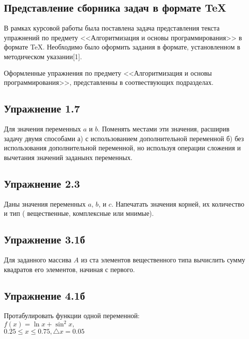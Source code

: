 \newpage
\begin{center}
\section{\fontsize{16pt}{16.8pt}Представление сборника задач в формате TeX }
\end{center}
\par
\fontsize{14pt}{16.8pt}\selectfont
В рамках курсовой работы была поставлена задача представления текста упражнений по предмету <<Алгоритмизация и основы программирования>> в формате TeX. Необходимо было оформить задания в формате, установленном в методическом указании[1].
\par
\fontsize{14pt}{16.8pt}\selectfont
Оформленные упражнения по предмету <<Алгоритмизация и основы программирования>>, представленны в соотвествующих подразделах.
\par

\subsection{\fontsize{14pt}{16.8pt}Упражнение 1.7}
\noindent
Для значения переменных $a$ и $b$. Поменять местами эти значения, расширив задачу двумя способами а) с использованием дополнительной переменной б) без использования дополнительной переменной, но используя операции сложения и вычетания значений заданынх переменных.

\subsection{\fontsize{14pt}{16.8pt}Упражнение 2.3}
\noindent
Даны значения переменных $a$, $b$, и $c$. Напечатать значения корней, их количество и тип ( вещественные, комплексные или мнимые).

\subsection{\fontsize{14pt}{16.8pt}Упражнение 3.1б}
\noindent
Для заданного массива $A$ из ста элементов вещественного типа вычислить сумму квадратов его элементов, начиная с первого.
  
\subsection{\fontsize{14pt}{16.8pt}Упражнение 4.1б}
\noindent
Протабулировать функции одной переменной:\\[2mm]
    $ f(x) = \ln x  +\sin^2 x,$\\
    $0.25 \leq x \leq 0.75,\triangle x = 0.05 $

